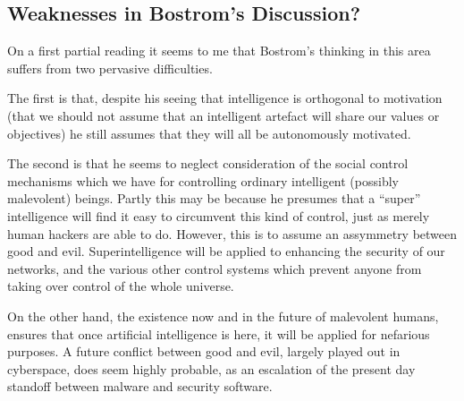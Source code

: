 \documentclass[12pt,titlepage]{article}
\begin{document}
\subsection{Weaknesses in Bostrom's Discussion?}

On a first partial reading it seems to me that Bostrom's thinking in this area suffers from two pervasive difficulties.

The first is that, despite his seeing that intelligence is orthogonal to motivation (that we should not assume that an intelligent artefact will share our values or objectives) he still assumes that they will all be autonomously motivated.

The second is that he seems to neglect consideration of the social control mechanisms which we have for controlling ordinary intelligent (possibly malevolent) beings.
Partly this may be because he presumes that a ``super'' intelligence will find it easy to circumvent this kind of control, just as merely human hackers are able to do.
However, this is to assume an assymmetry between good and evil.
Superintelligence will be applied to enhancing the security of our networks, and the various other control systems which prevent anyone from taking over control of the whole universe.

On the other hand, the existence now and in the future of malevolent humans, ensures that once artificial intelligence is here, it will be applied for nefarious purposes.
A future conflict between good and evil, largely played out in cyberspace, does seem highly probable, as an escalation of the present day standoff between malware and security software.



%
%






\end{document}
